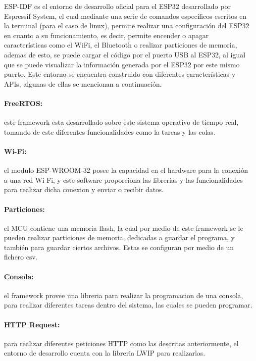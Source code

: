 ESP-IDF es el entorno de desarrollo oficial para el ESP32 desarrollado por Espressif System, el cual mediante una serie de comandos específicos escritos en la terminal (para el caso de linux), permite realizar una configuración del ESP32 en cuanto a su funcionamiento, es decir, permite encender o apagar características como el WiFi, el Bluetooth o realizar particiones de memoria, ademas de esto, se puede cargar el código por el puerto USB al ESP32, al igual que se puede visualizar la información generada por el ESP32 por este mismo puerto. Este entorno se encuentra construido con diferentes características y APIs, algunas de ellas se mencionan a continuación. \cite{ES}

\paragraph{FreeRTOS:}este framework esta desarrollado sobre este sistema operativo de tiempo real, tomando de este diferentes funcionalidades como la tareas y las colas.

\paragraph{Wi-Fi:}el modulo ESP-WROOM-32 posee la capacidad en el hardware para la conexión a una red Wi-Fi, y este software proporciona las librerias y las funcionalidades para realizar dicha conexion y enviar o recibir datos.

\paragraph{Particiones:}el MCU contiene una memoria flash, la cual por medio de este framework se le pueden realizar particiones de memoria, dedicadas a guardar el programa, y también para guardar ciertos archivos. Estas se configuran por medio de un fichero csv.

\paragraph{Consola:}el framework provee una libreria para realizar la programacion de una consola, para realizar diferentes tareas dentro del sistema, las cuales se pueden programar.

\paragraph{HTTP Request:}para realizar diferentes peticiones HTTP como las descritas anteriormente, el entorno de desarrollo cuenta con la libreria LWIP para realizarlas.

